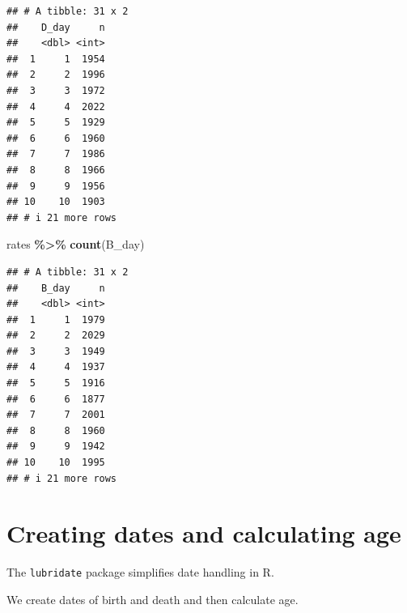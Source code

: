 \documentclass[
  11pt,
  oneside]{book}
\newenvironment{Shaded}{\begin{snugshade}}{\end{snugshade}}
\newcommand{\AttributeTok}[1]{\textcolor[rgb]{0.13,0.29,0.53}{#1}}
\newcommand{\ConstantTok}[1]{\textcolor[rgb]{0.56,0.35,0.01}{#1}}
\newcommand{\DecValTok}[1]{\textcolor[rgb]{0.00,0.00,0.81}{#1}}
\newcommand{\FloatTok}[1]{\textcolor[rgb]{0.00,0.00,0.81}{#1}}
\newcommand{\FunctionTok}[1]{\textcolor[rgb]{0.13,0.29,0.53}{\textbf{#1}}}
\newcommand{\NormalTok}[1]{#1}
\newcommand{\OtherTok}[1]{\textcolor[rgb]{0.56,0.35,0.01}{#1}}
\newcommand{\SpecialCharTok}[1]{\textcolor[rgb]{0.81,0.36,0.00}{\textbf{#1}}}
\newcommand{\StringTok}[1]{\textcolor[rgb]{0.31,0.60,0.02}{#1}}
\begin{document}
\begin{verbatim}
## # A tibble: 31 x 2
##    D_day     n
##    <dbl> <int>
##  1     1  1954
##  2     2  1996
##  3     3  1972
##  4     4  2022
##  5     5  1929
##  6     6  1960
##  7     7  1986
##  8     8  1966
##  9     9  1956
## 10    10  1903
## # i 21 more rows
\end{verbatim}

\begin{Shaded}
\begin{Highlighting}[]
\NormalTok{rates }\SpecialCharTok{\%\textgreater{}\%}
  \FunctionTok{count}\NormalTok{(B\_day)}
\end{Highlighting}
\end{Shaded}

\begin{verbatim}
## # A tibble: 31 x 2
##    B_day     n
##    <dbl> <int>
##  1     1  1979
##  2     2  2029
##  3     3  1949
##  4     4  1937
##  5     5  1916
##  6     6  1877
##  7     7  2001
##  8     8  1960
##  9     9  1942
## 10    10  1995
## # i 21 more rows
\end{verbatim}

\section{Creating dates and calculating age}\label{creating-dates-and-calculating-age}

The \texttt{lubridate} package simplifies date handling in R.

We create dates of birth and death and then calculate age.

\begin{Shaded}
\end{Shaded}
\end{document}
